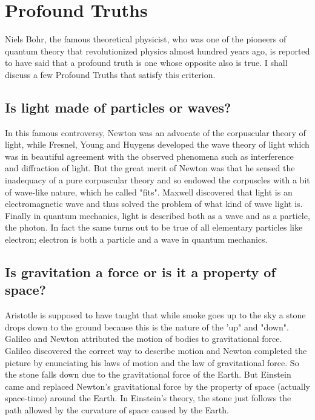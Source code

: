 \chapter{Profound Truths}\label{chap15}

\lhead[\small\thepage]{\small\leftmark}

                   

Niels Bohr, the famous theoretical physicist, who was one
of the pioneers of quantum theory that revolutionized physics
almost hundred years ago, is reported to have said that a
profound truth is one whose opposite also is true. I shall
discuss a few Profound Truths that satisfy this criterion.

\section{Is light made of particles or waves?}

In this famous controversy, Newton was an advocate of the
corpuscular theory of light, while Fresnel, Young and Huygens
developed the wave theory of light which was in beautiful
agreement with the observed phenomena such as interference
and diffraction of light. But the great merit of Newton was 
that he sensed the inadequacy of a pure corpuscular theory
and so endowed the corpuscles with a bit of wave-like nature,
which he called "fits". Maxwell discovered that light is an
electromagnetic wave and thus solved the problem of what 
kind of wave light is. Finally in quantum mechanics, light
is described both as a wave and as a particle, the photon.
In fact the same turns out to be true of all elementary
particles like electron; electron is both a particle and
a wave in quantum mechanics.

\newpage

\section{Is gravitation a force or is it a property of space?}

Aristotle is supposed to have taught that while smoke
goes up to the sky a stone drops down to the ground because
this is the nature of the 'up" and "down". Galileo and Newton
attributed the motion of bodies to gravitational force.
Galileo discovered the correct way to describe motion and
Newton completed the picture by enunciating his laws of
motion and the law of gravitational force. So the stone
falls down due to the gravitational force of the Earth.
But Einstein came and replaced Newton's gravitational force
by the property of space (actually space-time) around the
Earth. In Einstein's theory, the stone just follows the
path allowed by the curvature of space caused by the Earth.

